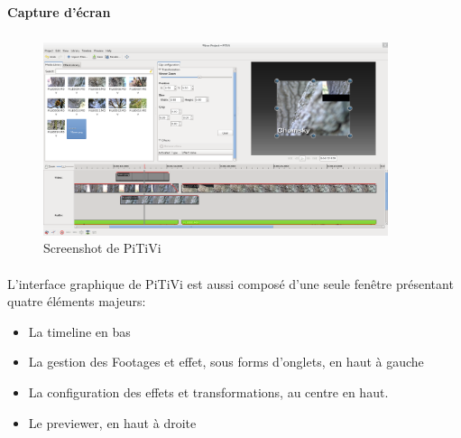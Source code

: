 \paragraph {Capture d'écran}

\subparagraph{}

\begin{figure}[H]

  \begin{center}

    \includegraphics[width=0.90\textwidth]{images/pitivi}

  \end{center}

  \caption{Screenshot de PiTiVi}

  \label{Yes}

\end{figure}

\paragraph{}

L'interface graphique de PiTiVi est aussi composé d'une seule fenêtre
présentant quatre éléments majeurs:

\begin{itemize}

  \item {La timeline en bas}

  \item {La gestion des Footages et effet, sous forms d'onglets, en haut
  à gauche}

  \item {La configuration des effets et transformations, au centre
  en haut.}

  \item {Le previewer, en haut à droite}

\end{itemize}

